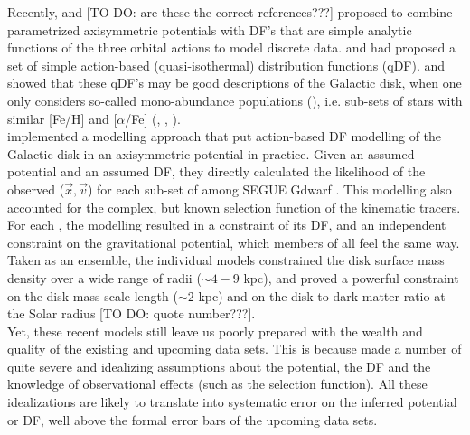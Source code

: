 Recently, \cite{bin12b} and \cite{bov13} [TO DO: are these the correct references???] proposed to combine parametrized axisymmetric potentials with DF's that are simple analytic functions of the three orbital actions to model discrete data. \cite{bin10} and \cite{bin11} had proposed a set of simple action-based (quasi-isothermal) distribution functions (qDF). \cite{Tin13} and \cite{bov13} showed that these qDF's may be good descriptions of the Galactic disk, when one only considers so-called mono-abundance populations (\MAP), i.e. sub-sets of stars with similar [Fe/H] and [$\alpha$/Fe] (\cite{bov12b}, \cite{bov12c}, \cite{bov12d}). \\

\cite{bov13} implemented a modelling approach that put action-based DF modelling of the Galactic disk in an axisymmetric potential in practice. Given an assumed potential and an assumed DF, they directly calculated the likelihood of the observed ($\vec{x},\vec{v}$) for each sub-set of \MAP among SEGUE Gdwarf \citep{yan09}. This modelling also accounted for the complex, but known selection function of the kinematic tracers.  For each \MAP, the modelling resulted in a constraint of its DF, and an independent constraint on the gravitational potential, which members of all \MAPs feel the same way. \\
Taken as an ensemble, the individual \MAP models constrained the disk surface mass density over a wide range of radii ($\sim 4-9$ kpc), and proved a powerful constraint on the disk mass scale length ($\sim 2$ kpc) and on the disk to dark matter ratio at the Solar radius [TO DO: quote number???]. \\

Yet, these recent models still leave us poorly prepared with the wealth and quality of the existing and upcoming data sets. This is because \cite{bov13} made a number of quite severe and idealizing assumptions about the potential, the DF and the knowledge of observational effects (such as the selection function). All these idealizations are likely to translate into systematic error on the inferred potential or DF, well above the formal error bars of the upcoming data sets. \\

